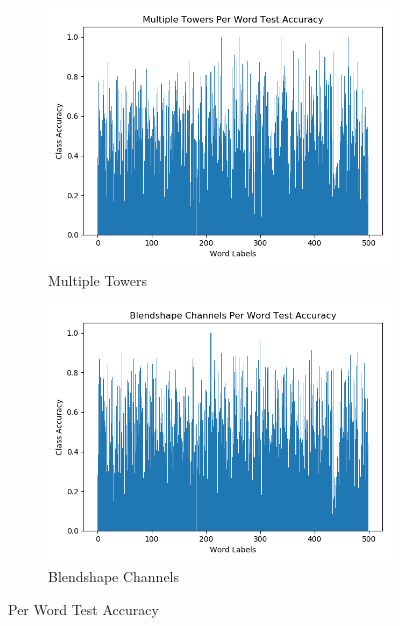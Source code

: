 \begin{figure}[h!]
    \centering
    \begin{subfigure}[b]{0.49\textwidth}
        \includegraphics[width=\textwidth]{figures/classification/blendshape_multi_tower_class_acc.png}
        \caption{Multiple Towers}\label{fig:multiple_towers_word_acc}
    \end{subfigure}
    \begin{subfigure}[b]{0.49\textwidth}
        \includegraphics[width=\textwidth]{figures/classification/blendshape_channel_class_acc.png}
        \caption{Blendshape Channels}\label{fig:channels_word_acc}
    \end{subfigure}
    \caption{Per Word Test Accuracy}\label{fig:both_models_word_acc}
\end{figure}

